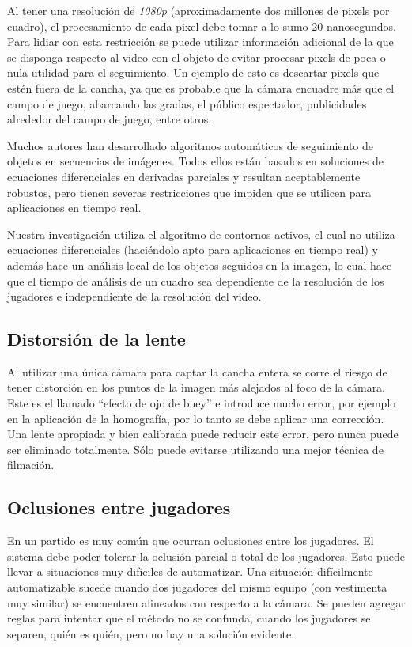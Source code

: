 Al tener una resolución de \textit{1080p} (aproximadamente dos millones de
pixels por cuadro), el procesamiento de cada pixel debe tomar a lo sumo 20
nanosegundos.  Para lidiar con esta restricción se puede utilizar información
adicional de la que se disponga respecto al video con el objeto de evitar
procesar pixels de poca o nula utilidad para el seguimiento. Un ejemplo de esto
es descartar pixels que estén fuera de la cancha, ya que es probable que la
cámara encuadre más que el campo de juego, abarcando las gradas, el público
espectador, publicidades alrededor del campo de juego, entre otros.

Muchos autores han desarrollado algoritmos automáticos de seguimiento de
objetos en secuencias de imágenes\cite{IFTrace, alp, local-learning, MHT-2}.
Todos ellos están basados en soluciones de ecuaciones diferenciales en
derivadas parciales y resultan aceptablemente robustos, pero tienen severas
restricciones que impiden que se utilicen para aplicaciones en tiempo real.

Nuestra investigación utiliza el algoritmo de contornos
activos\cite{fast-level-set}, el cual no utiliza ecuaciones diferenciales
(haciéndolo apto para aplicaciones en tiempo real) y además hace un análisis
local de los objetos seguidos en la imagen, lo cual hace que el tiempo de
análisis de un cuadro sea dependiente de la resolución de los jugadores e
independiente de la resolución del video.

\subsection{Distorsión de la lente}

Al utilizar una única cámara para captar la cancha entera se corre el riesgo de
tener distorción en los puntos de la imagen más alejados al foco de la cámara.
Este es el llamado ``efecto de ojo de buey'' e introduce mucho error, por ejemplo
en la aplicación de la homografía, por lo
tanto se debe aplicar una corrección. Una lente apropiada y bien calibrada
puede reducir este error, pero nunca puede ser eliminado totalmente. Sólo
puede evitarse utilizando una mejor técnica de filmación.

\subsection{Oclusiones entre jugadores}

En un partido es muy común que ocurran oclusiones entre los jugadores. El
sistema debe poder tolerar la oclusión parcial o total de los jugadores.
Esto puede llevar a situaciones muy difíciles de automatizar. Una situación
difícilmente automatizable sucede cuando dos jugadores del mismo equipo (con
vestimenta muy similar) se encuentren alineados con respecto a la cámara.
Se pueden agregar reglas para intentar que el método no se confunda, cuando
los jugadores se separen, quién es quién, pero no hay una solución evidente.


